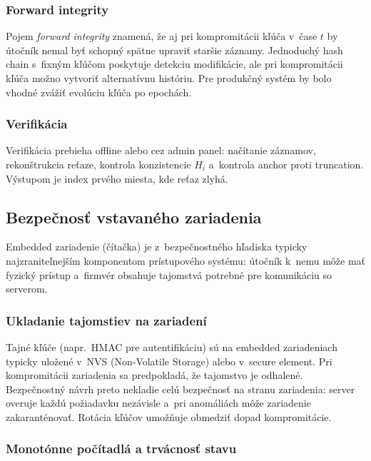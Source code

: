 \subsubsection{Forward integrity}

Pojem \emph{forward integrity}\cite{SchneierKelsey1999} znamená, že aj pri kompromitácii kľúča v~čase $t$ by útočník nemal byť schopný spätne upraviť staršie záznamy. Jednoduchý hash chain s~fixným kľúčom poskytuje detekciu modifikácie, ale pri kompromitácii kľúča možno vytvoriť alternatívnu históriu. Pre produkčný systém by bolo vhodné zvážiť evolúciu kľúča po epochách.

\subsubsection{Verifikácia}

Verifikácia prebieha offline alebo cez admin panel: načítanie záznamov, rekonštrukcia reťaze, kontrola konzistencie $H_i$ a~kontrola anchor proti truncation. Výstupom je index prvého miesta, kde reťaz zlyhá.


\subsection{Bezpečnosť vstavaného zariadenia}

Embedded zariadenie (čítačka) je z~bezpečnostného hľadiska typicky najzraniteľnejším komponentom prístupového systému\cite{NIST80094}: útočník k~nemu môže mať fyzický prístup a~firmvér obsahuje tajomstvá potrebné pre komunikáciu so serverom.

\subsubsection{Ukladanie tajomstiev na zariadení}

Tajné kľúče (napr.~HMAC pre autentifikáciu) sú na embedded zariadeniach typicky uložené v~NVS (Non-Volatile Storage) alebo v~secure element\cite{NIST80094}. Pri kompromitácii zariadenia sa predpokladá, že tajomstvo je odhalené\cite{NIST80053}. Bezpečnostný návrh preto nekladie celú bezpečnosť na stranu zariadenia: server overuje každú požiadavku nezávisle a~pri anomáliách môže zariadenie zakaranténovať. Rotácia kľúčov umožňuje obmedziť dopad kompromitácie\cite{NIST80057}.

\subsubsection{Monotónne počítadlá a trvácnosť stavu}

